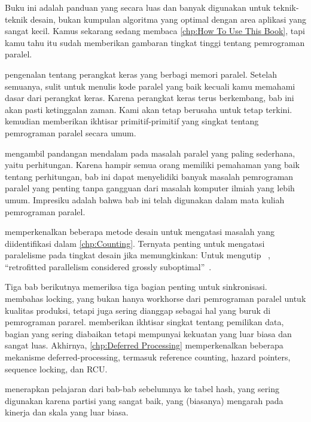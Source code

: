Buku ini adalah panduan yang secara luas dan banyak digunakan untuk
teknik-teknik desain, bukan kumpulan algoritma yang optimal dengan
area aplikasi yang sangat kecil.
Kamus sekarang sedang membaca \cref{chp:How To Use This Book}, tapi
kamu tahu itu sudah memberikan gambaran tingkat tinggi tentang 
pemrograman paralel.

 pengenalan tentang perangkat keras
yang berbagi memori paralel.
Setelah semuanya, sulit untuk menulis kode paralel yang baik kecuali
kamu memahami dasar dari perangkat keras.
Karena perangkat keras terus berkembang, bab ini akan pasti
ketinggalan zaman.
Kami akan tetap berusaha untuk tetap terkini.
 kemudian memberikan ikhtisar primitif-primitif
yang singkat tentang pemrograman paralel secara umum.

 mengambil pandangan mendalam pada masalah
paralel yang paling sederhana, yaitu perhitungan.
Karena hampir semua orang memiliki pemahaman yang baik tentang
perhitungan, bab ini dapat menyelidiki banyak masalah
pemrograman paralel yang penting tanpa gangguan dari masalah
komputer ilmiah yang lebih umum.
Impresiku adalah bahwa bab ini telah digunakan dalam
mata kuliah pemrograman paralel.

memperkenalkan beberapa metode desain untuk mengatasi masalah
yang diidentifikasi dalam \cref{chp:Counting}.
Ternyata penting untuk mengatasi paralelisme pada tingkat
desain jika memungkinkan:
Untuk mengutip ~\cite{Dijkstra:1968:LEG:362929.362947},
``retrofitted parallelism considered grossly
suboptimal''~\cite{PaulEMcKenney2012HOTPARsuboptimal}.

Tiga bab berikutnya memeriksa tiga bagian penting untuk
sinkronisasi.
 membahas locking, yang bukan hanya
workhorse dari pemrograman paralel untuk kualitas produksi, tetapi juga
sering dianggap sebagai hal yang buruk di pemrograman pararel.
 memberikan ikhtisar singkat tentang
pemilikan data, bagian yang sering diabaikan tetapi
mempunyai kekuatan yang luar biasa dan sangat luas.
Akhirnya, \cref{chp:Deferred Processing} memperkenalkan beberapa
mekanisme deferred-processing, termasuk reference counting,
hazard pointers, sequence locking, dan RCU\@.

 menerapkan pelajaran dari bab-bab
sebelumnya ke tabel hash, yang sering digunakan karena
partisi yang sangat baik, yang (biasanya) mengarah pada kinerja
dan skala yang luar biasa.

